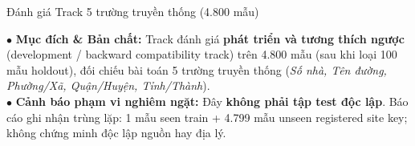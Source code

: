 \documentclass[aspectratio=169, 9pt]{beamer}
\begin{document}
\begin{frame}{Đánh giá Track 5 trường truyền thống (4.800 mẫu)}
  \vspace{-0.15cm}
  \begin{center}
  \end{center}
  \vspace{0.12cm}
  {\fontsize{8.2pt}{10.5pt}\selectfont
  $\bullet$ \textbf{Mục đích \& Bản chất:} Track đánh giá \textbf{phát triển và tương thích ngược} (development / backward compatibility track) trên 4.800 mẫu (sau khi loại 100 mẫu holdout), đối chiếu bài toán 5 trường truyền thống (\textit{Số nhà, Tên đường, Phường/Xã, Quận/Huyện, Tỉnh/Thành}).\\[3pt]
  $\bullet$ \textbf{Cảnh báo phạm vi nghiêm ngặt:} Đây \textbf{không phải tập test độc lập}. Báo cáo ghi nhận trùng lặp: 1 mẫu seen train + 4.799 mẫu unseen registered site key; không chứng minh độc lập nguồn hay địa lý.
  }
\end{frame}
\end{document}
